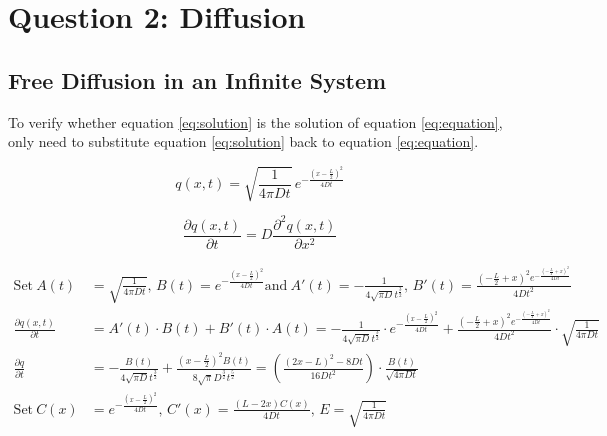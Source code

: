 \section{Question 2: Diffusion}

\subsection{Free Diffusion in an Infinite System}

To verify whether equation \ref{eq:solution} is the solution
of equation \ref{eq:equation}, 
only need to substitute equation \ref{eq:solution} back to 
equation \ref{eq:equation}.


\begin{minipage}{.5\textwidth}
    \begin{equation}
        q(x, t) = \sqrt{\frac{1}{4\pi Dt}} \, e^{-\frac{(x - \frac{L}{2})^2}{4Dt}}
        \label{eq:solution}
    \end{equation}
\end{minipage}
\begin{minipage}{.5\textwidth}
    \begin{equation}
        \frac{\partial q(x, t)}{\partial t} = D \frac{\partial^2 q(x, t)}{\partial x^2}
        \label{eq:equation}
    \end{equation}
\end{minipage}
\begin{align*}
    \text{Set} \: A(t) &= \sqrt{\frac{1}{4\pi Dt}}, \, B(t) = e^{-\frac{(x - \frac{L}{2})^2}{4Dt}}
    \text{and} \: A'(t) = - \frac{1}{4 \sqrt{\pi D} t^{\frac{3}{2}}}, \, 
    B'(t) = \frac{\left(- \frac{L}{2} + x\right)^{2} e^{- \frac{\left(- \frac{L}{2} + x\right)^{2}}{4 D t}}}{4 D t^{2}}\\
    \frac{\partial q(x, t)}{\partial t} &= A'(t) \cdot B(t) + B'(t) \cdot A(t)
    = - \frac{1}{4 \sqrt{\pi D} t^{\frac{3}{2}}} \cdot e^{-\frac{(x - \frac{L}{2})^2}{4Dt}} + 
    \frac{\left(- \frac{L}{2} + x\right)^{2} e^{- \frac{\left(- \frac{L}{2} + x\right)^{2}}{4 D t}}}{4 D t^{2}} \cdot \sqrt{\frac{1}{4\pi Dt}}\\
    \frac{\partial q}{\partial t} &= -\frac{B(t)}{4\sqrt{\pi D} t^{\frac{3}{2}}} + \frac{(x - \frac{L}{2})^2 B(t)}{8\sqrt{\pi} D^{\frac{3}{2}} t^{\frac{5}{2}}}
    = \left(\frac{(2x - L)^2 - 8Dt}{16Dt^2}  \right) \cdot \frac{B(t)}{\sqrt{4 \pi D t}}\\
    \text{Set} \: C(x) &= e^{-\frac{(x - \frac{L}{2})^2}{4Dt}}, \, C'(x) = \frac{(L - 2 x) C(x)}{4 D t}, \, E = \sqrt{\frac{1}{4\pi Dt}}\\
\end{align*}

